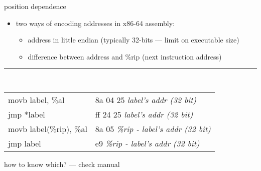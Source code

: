 \begin{frame}[fragile,label=picVNot]{position dependence}
\begin{itemize}
\item two ways of encoding addresses in x86-64 assembly:
    \begin{itemize}
    \item address in little endian (typically 32-bits --- limit on executable size)
    \item difference between address and \%rip (next instruction address)
    \end{itemize}
\end{itemize}
\hrule
{\tt
\begin{tabular}{l|l}
movb label, \%al & 8a 04 25 {\normalfont\it label's addr (32 bit)} \\
jmp *label & ff 24 25 {\normalfont\it label's addr (32 bit)} \\
movb label(\%rip), \%al & 8a 05 {\normalfont\it \%rip - label's addr (32 bit)} \\
jmp label & e9 {\normalfont\it \%rip - label's addr (32 bit)} \\
\end{tabular}
}
how to know which? --- check manual
\end{frame}
